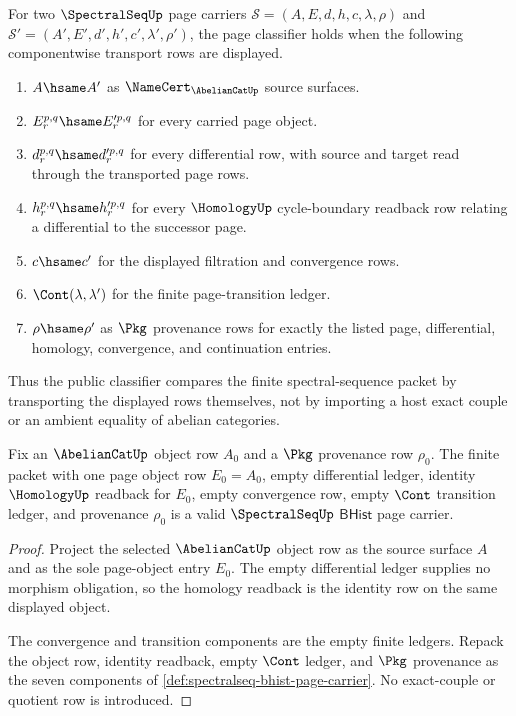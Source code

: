 \begin{definition}
\label{def:spectralseq-page-classifier}
For two $\SpectralSeqUp$ page carriers
$\mathcal S=(A,E,d,h,c,\lambda,\rho)$ and
$\mathcal S'=(A',E',d',h',c',\lambda',\rho')$, the page classifier holds when
the following componentwise transport rows are displayed.
\begin{enumerate}
  \item $A\hsame A'$ as $\NameCert_{\AbelianCatUp}$ source surfaces.
  \item $E_r^{p,q}\hsame E_r'^{p,q}$ for every carried page object.
  \item $d_r^{p,q}\hsame d_r'^{p,q}$ for every differential row, with source
  and target read through the transported page rows.
  \item $h_r^{p,q}\hsame h_r'^{p,q}$ for every $\HomologyUp$ cycle-boundary
  readback row relating a differential to the successor page.
  \item $c\hsame c'$ for the displayed filtration and convergence rows.
  \item $\Cont(\lambda,\lambda')$ for the finite page-transition ledger.
  \item $\rho\hsame\rho'$ as $\Pkg$ provenance rows for exactly the listed
  page, differential, homology, convergence, and continuation entries.
\end{enumerate}
Thus the public classifier compares the finite spectral-sequence packet by
transporting the displayed rows themselves, not by importing a host exact
couple or an ambient equality of abelian categories.
\end{definition}

\begin{theorem}
\label{thm:spectralseq-zero-page-carrier}
Fix an $\AbelianCatUp$ object row $A_0$ and a $\Pkg$ provenance row $\rho_0$.
The finite packet with one page object row $E_0=A_0$, empty differential
ledger, identity $\HomologyUp$ readback for $E_0$, empty convergence row, empty
$\Cont$ transition ledger, and provenance $\rho_0$ is a valid
$\SpectralSeqUp$ $\mathsf{BHist}$ page carrier.
\end{theorem}
\begin{proof}
Project the selected $\AbelianCatUp$ object row as the source surface $A$ and
as the sole page-object entry $E_0$. The empty differential ledger supplies no
morphism obligation, so the homology readback is the identity row on the same
displayed object.

The convergence and transition components are the empty finite ledgers. Repack
the object row, identity readback, empty $\Cont$ ledger, and $\Pkg$ provenance
as the seven components of
\autoref{def:spectralseq-bhist-page-carrier}. No exact-couple or quotient row
is introduced.
\end{proof}

